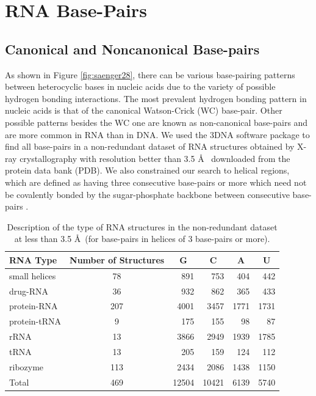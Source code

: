 \chapter{RNA Base-Pairs}
\label{basepairs} 

\section{Canonical and Noncanonical Base-pairs}
As  shown   in  Figure  \ref{fig:saenger28},  there   can  be  various
base-pairing patterns between heterocyclic  bases in nucleic acids due
to the  variety of possible  hydrogen bonding interactions.   The most
prevalent hydrogen  bonding pattern  in nucleic acids  is that  of the
canonical  Watson-Crick  (WC)  base-pair.   Other  possible  patterns
besides the WC one are known as non-canonical base-pairs and are more
common in  RNA than in DNA.   We used the  3DNA \cite{lu2003} software
package  to find  all base-pairs  in  a non-redundant  dataset of  RNA
structures  obtained by X-ray  crystallography with  resolution better
than 3.5  \AA~ downloaded from the  protein data bank  (PDB).  We also
constrained our search to helical regions, which are defined as having
three  consecutive base-pairs  or more  which need  not  be covalently
bonded by the  sugar-phosphate backbone between consecutive base-pairs
\cite{olson2009}.

\begin{table}[htbp]
\begin{center}
\begin{tabular}{|l|c|r|r|r|r|}
\hline
RNA Type & \multicolumn{1}{p{2cm}|}{Number of Structures} & \multicolumn{1}{c|}{G} &
\multicolumn{1}{c|}{C} & \multicolumn{1}{c|}{A} &
\multicolumn{1}{c|}{U} \\ \hline 
small helices & 78 & 891 & 753 & 404 & 442 \\ \hline
drug-RNA & 36 & 932 & 862 & 365 & 433 \\ \hline
protein-RNA & 207 & 4001 & 3457 & 1771 & 1731 \\ \hline
protein-tRNA & 9 & 175 & 155 & 98 & 87 \\ \hline
rRNA & 13 & 3866 & 2949 & 1939 & 1785 \\ \hline
tRNA & 13 & 205 & 159 & 124 & 112 \\ \hline
ribozyme & 113 & 2434 & 2086 & 1438 & 1150 \\ \hline
Total & 469 & \multicolumn{1}{c|}{12504} & \multicolumn{1}{c|}{10421} & \multicolumn{1}{c|}{6139} & \multicolumn{1}{c|}{5740} \\ \hline
\end{tabular}
\caption{Description   of  the   type   of  RNA   structures  in   the
  non-redundant  dataset  at  less  than 3.5  \AA~(for  base-pairs  in
  helices of 3 base-pairs or more).}
\label{tab:dbase}
\end{center}
\end{table}

